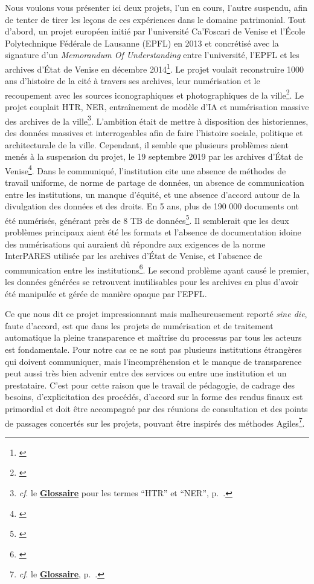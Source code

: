 Nous voulons vous présenter ici deux projets, l'un en cours, l'autre suspendu, afin de tenter de tirer les leçons de ces expériences dans le domaine patrimonial. Tout d'abord, un projet européen initié par l'université Ca'Foscari de Venise et l'École Polytechnique Fédérale de Lausanne (EPFL) en 2013 et concrétisé avec la signature d'un \textit{Memorandum Of Understanding} entre l'université, l'EPFL et les archives d'État de Venise en décembre 2014\footnote{\cite{castelvecchi_venice_2019}}. Le projet voulait reconstruire 1000 ans d'histoire de la cité à travers ses archives, leur numérisation et le recoupement avec les sources iconographiques et photographiques de la ville\footnote{\cite{epfl_presentation_2017}}. Le projet couplait HTR, NER, entraînement de modèle d'IA et numérisation massive des archives de la ville\footnote{\textit{cf}. le \textbf{\hyperref[sec:Glossaire]{Glossaire}} pour les termes \enquote{HTR} et \enquote{NER}, p.~\pageref{sec:Glossaire}.}. L'ambition était de mettre à disposition des historien\wokisme nes, des données massives et interrogeables afin de faire l'histoire sociale, politique et architecturale de la ville. Cependant, il semble que plusieurs problèmes aient menés à la suspension du projet, le 19 septembre 2019 par les archives d'État de Venise\footnote{\cite{noauthor_sospensione_nodate}}. Dans le communiqué, l'institution cite une absence de méthodes de travail uniforme, de norme de partage de données, un absence de communication entre les institutions, un manque d'équité, et une absence d'accord autour de la divulgation des données et des droits. En 5 ans, plus de 190 000 documents ont été numérisés, générant près de 8 TB de données\footnote{\cite{burns_venice_2019}}. Il semblerait que les deux problèmes principaux aient été les formats et l'absence de documentation idoine des numérisations qui auraient dû répondre aux exigences de la norme InterPARES utilisée par les archives d'État de Venise, et l'absence de communication entre les institutions\footnote{\cite{castelvecchi_venice_2019}}. Le second problème ayant causé le premier, les données générées se retrouvent inutilisables pour les archives en plus d'avoir été manipulée et gérée de manière opaque par l'EPFL. 

Ce que nous dit ce projet impressionnant mais malheureusement reporté \textit{sine die}, faute d'accord, est que dans les projets de numérisation et de traitement automatique la pleine transparence et maîtrise du processus par tous les acteurs est fondamentale. Pour notre cas ce ne sont pas plusieurs institutions étrangères qui doivent communiquer, mais l'incompréhension et le manque de transparence peut aussi très bien advenir entre des services ou entre une institution et un prestataire. C'est pour cette raison que le travail de pédagogie, de cadrage des besoins, d'explicitation des procédés, d'accord sur la forme des rendus finaux est primordial et doit être accompagné par des réunions de consultation et des points de passages concertés sur les projets, pouvant être inspirés des méthodes Agiles\footnote{\textit{cf}. le \textbf{\hyperref[sec:Glossaire]{Glossaire}}, p.~\pageref{sec:Glossaire}.}. 


